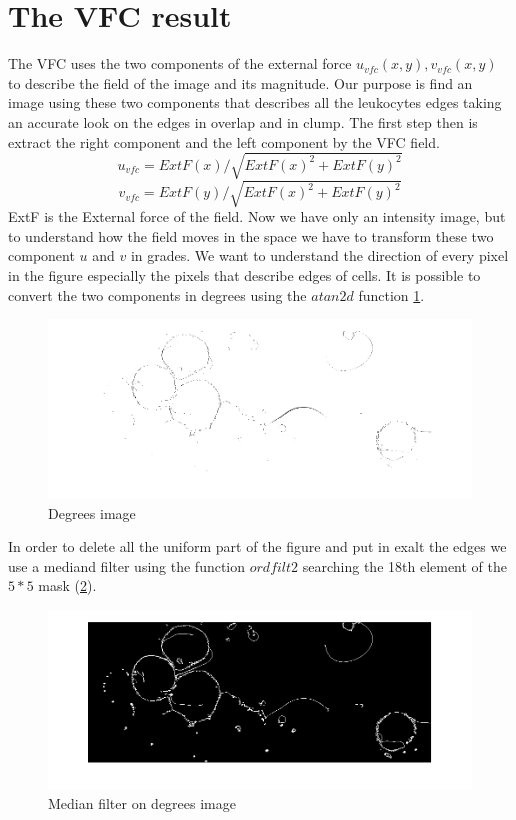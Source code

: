 \section{The VFC result}
The VFC uses the two components of the external force ${u} _{vfc} ( x,y ) , {v} _{vfc} (x,y)$ to describe the field of the image and its magnitude. Our purpose is find an image using these two components that describes all the leukocytes edges taking an accurate look on the edges in overlap and in clump. The first step then is extract the right component and the left component by the VFC field.
\begin{equation}
{u} _{vfc}=ExtF(x)/\sqrt{ExtF(x)^{2} + ExtF(y)^{2}}
\end{equation}
\begin{equation}
{v} _{vfc}=ExtF(y)/\sqrt{ExtF(x)^{2} + ExtF(y)^{2}}
\end{equation}
ExtF is the External force of the field. Now we have only an intensity image, but to understand how the field moves in the space we have to transform these two component $ u$ and $ v $ in grades. We want to understand the direction of every pixel in the figure especially the pixels that describe edges of cells. It is possible to convert the two components in degrees using the $atan2d$ function \ref{fig:angle}.
\begin{figure}
	\begin{center}
		\centering
		\includegraphics[scale=0.5]{img/angle.png}
		\caption{Degrees image}
		\label{fig:angle}
	\end{center}
\end{figure}
In order to delete all the uniform part of the figure and put in exalt the edges we use a mediand filter using the function $ordfilt2$ searching the 18th element of the $5 * 5$ mask (\ref{fig:Pmedangle}).
\begin{figure}
	\begin{center}
		\centering
		\includegraphics[scale=0.5]{img/PmedAngle.png}
		\caption{Median filter on degrees image}
		\label{fig:Pmedangle}
	\end{center}
\end{figure}
